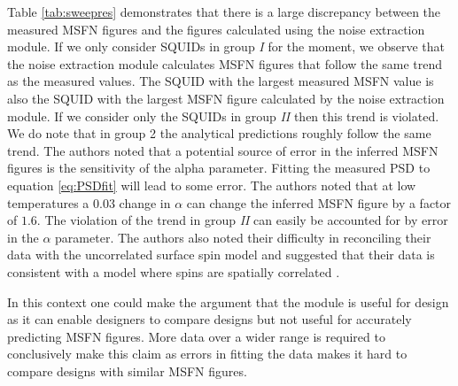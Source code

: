 Table \ref{tab:sweepres} demonstrates that there is a large discrepancy between the measured MSFN figures and the figures calculated using the noise extraction module. If we only consider SQUIDs in group \textit{I} for the moment, we observe that the noise extraction module calculates MSFN figures that follow the same trend as the measured values. The SQUID with the largest measured MSFN value is also the SQUID with the largest MSFN figure calculated by the noise extraction module. If we consider only the SQUIDs in group \textit{II} then this trend is violated. We do note that in group 2 the analytical predictions roughly follow the same trend. The authors noted that a potential source of error in the inferred MSFN figures is the sensitivity of the alpha parameter. Fitting the measured PSD to equation \ref{eq:PSDfit} will lead to some error. The authors noted that at low temperatures a $0.03$ change in $\alpha$ can change the inferred MSFN figure by a factor of $1.6$. The violation of the trend in group \textit{II} can easily be accounted for by error in the $\alpha$ parameter. The authors also noted their difficulty in reconciling their data with the uncorrelated surface spin model and suggested that their data is consistent with a model where spins are spatially correlated \cite{fluxNoiseSquidsStevenAnton}. \par
In this context one could make the argument that the module is useful for design as it can enable designers to compare designs but not useful for accurately predicting MSFN figures. More data over a wider range is required to conclusively make this claim as errors in fitting the data makes it hard to compare designs with similar MSFN figures.